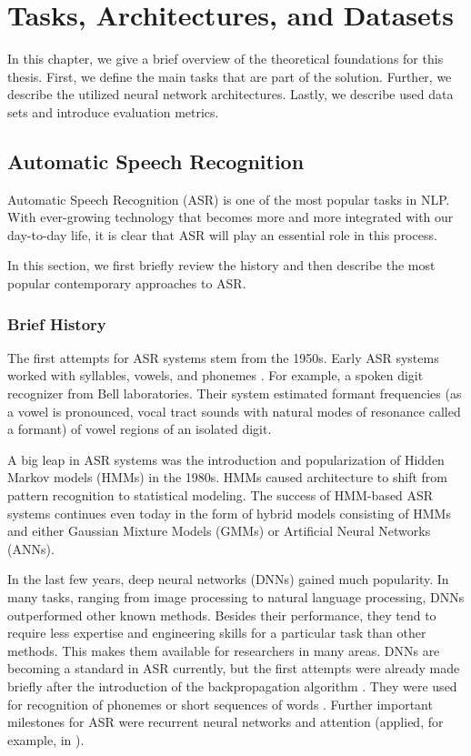 \chapter{Tasks, Architectures, and Datasets}
\label{chap:theory}

In this chapter, we give a brief overview of the theoretical foundations for this thesis. First, we define the main tasks that are part of the solution. Further, we describe the utilized neural network architectures. Lastly, we describe used data sets and introduce evaluation metrics.

\section{Automatic Speech Recognition}

Automatic Speech Recognition (ASR) is one of the most popular tasks in NLP. With ever-growing technology that becomes more and more integrated with our day-to-day life, it is clear that ASR will play an essential role in this process.

In this section, we first briefly review the history and then describe the most popular contemporary approaches to ASR.

\subsection{Brief History}

The first attempts for ASR systems stem from the 1950s. Early ASR systems worked with syllables, vowels, and phonemes . For example, a spoken digit recognizer from Bell laboratories. Their system estimated formant frequencies (as a vowel is pronounced, vocal tract sounds with natural modes of resonance called a formant) of vowel regions of an isolated digit. 

A big leap in ASR systems was the introduction and popularization of Hidden Markov models (HMMs) in the 1980s. HMMs caused architecture to shift from pattern recognition to statistical modeling. The success of HMM-based ASR systems continues even today in the form of hybrid models consisting of HMMs and either Gaussian Mixture Models (GMMs) or Artificial Neural Networks (ANNs).

In the last few years, deep neural networks (DNNs) gained much popularity. In many tasks, ranging from image processing to natural language processing, DNNs outperformed other known methods. Besides their performance, they tend to require less expertise and engineering skills for a particular task than other methods. This makes them available for researchers in many areas. DNNs are becoming a standard in ASR currently, but the first attempts were already made briefly after the introduction of the backpropagation algorithm . They were used for recognition of phonemes  or short sequences of words . Further important milestones for ASR were recurrent neural networks and attention (applied, for example, in ).


